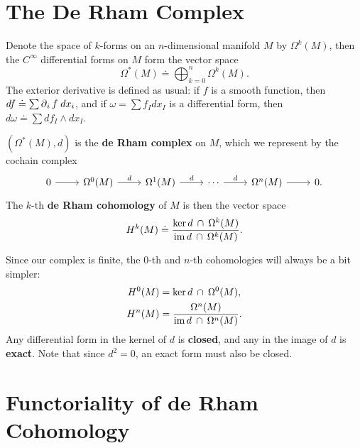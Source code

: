 \documentclass[twoside,10pt]{article}
\begin{document}


\section{The De Rham Complex}

Denote the space of $k$-forms on an $n$-dimensional manifold $M$ by $\Omega^{k}(M)$, then the $C^{\infty}$ differential forms on $M$ form the vector space
\[
	\Omega^{*}(M) \doteq \bigoplus_{k=0}^{n} \Omega^{k}(M).
\] The exterior derivative is defined as usual: if $f$ is a smooth function, then $df \doteq \sum \operatorname{\partial}_{i}{f} \;dx_i$, and if $\omega = \sum f_{I}dx_{I}$ is a differential form, then $d\omega \doteq \sum df_{I} \wedge dx_{I}$.

\begin{defn}[]
$\left( \Omega^{*}(M), d \right)$ is the \textbf{de Rham complex} on $M$, which we represent by the cochain complex
\[
\begin{tikzcd}
	0\rar &\Omega^{0}(M) \rar{d}&\Omega^{1}(M)\rar{d}&\cdots\rar{d}&\Omega^{n}(M)\rar&0.
\end{tikzcd}
\] The $k$-th \textbf{de Rham cohomology} of $M$ is then the vector space
\[
	H^{k}(M) \doteq \frac{\ker d \operatorname{\;\cap\;}\Omega^{k}(M)}{\operatorname{im} d \operatorname{\;\cap\;} \Omega^{k}(M)} .
\] 
\end{defn}
Since our complex is finite, the $0$-th and $n$-th cohomologies will always be a bit simpler:
\begin{align*}
	H^{0}(M) &= \ker d \operatorname{\;\cap\;} \Omega^{0}(M),\\
	H^{n}(M) &= \frac{\Omega^{n}(M)}{\operatorname{im} d \operatorname{\;\cap\;} \Omega^{n}(M)} .
\end{align*}
Any differential form in the kernel of $d$ is \textbf{closed}, and any in the image of $d$ is \textbf{exact}. Note that since $d^{2}=0$, an exact form must also be closed.


\section{Functoriality of de Rham Cohomology}
\end{document}
